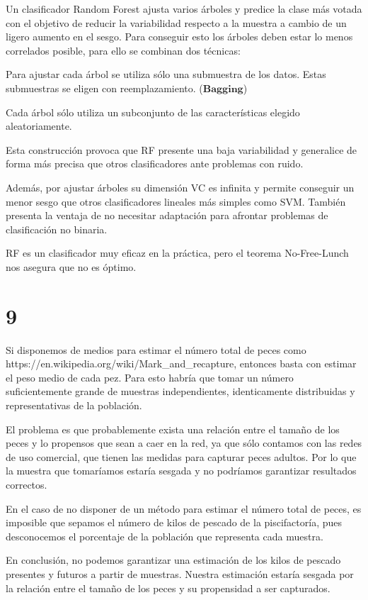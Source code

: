 \documentclass{article}
\begin{document}
Un clasificador Random Forest ajusta varios árboles y predice la clase
más votada con el objetivo de reducir la variabilidad respecto a la
muestra a cambio de un ligero aumento en el sesgo. Para conseguir esto
los árboles deben estar lo menos correlados posible, para ello se
combinan dos técnicas:

Para ajustar cada árbol se utiliza sólo una
submuestra de los datos. Estas submuestras se eligen con
reemplazamiento. (\(\textbf{Bagging}\))

Cada árbol sólo utiliza un subconjunto de las características elegido
aleatoriamente.

Esta construcción provoca que RF presente una baja variabilidad y
generalice de forma más precisa que otros clasificadores ante
problemas con ruido.

Además, por ajustar árboles su dimensión VC es infinita y permite
conseguir un menor sesgo que otros clasificadores lineales más simples
como SVM. También presenta la ventaja de no necesitar adaptación para
afrontar problemas de clasificación no binaria.

RF es un clasificador muy eficaz en la práctica, pero el teorema
No-Free-Lunch nos asegura que no es óptimo.

\section{9}

Si disponemos de medios para estimar el número total de peces como
https://en.wikipedia.org/wiki/Mark\_and\_recapture, entonces basta con
estimar el peso medio de cada pez. Para esto habría que tomar un
número suficientemente grande de muestras independientes,
identicamente distribuidas y representativas de la población.

El problema es que probablemente exista una relación entre el tamaño
de los peces y lo propensos que sean a caer en la red, ya que sólo
contamos con las redes de uso comercial, que tienen las medidas para
capturar peces adultos. Por lo que la muestra que tomaríamos estaría
sesgada y no podríamos garantizar resultados correctos.

En el caso de no disponer de un método para estimar el número total de
peces, es imposible que sepamos el número de kilos de pescado de la
piscifactoría, pues desconocemos el porcentaje de la población que
representa cada muestra.

En conclusión, no podemos garantizar una estimación de los kilos de
pescado presentes y futuros a partir de muestras. Nuestra estimación
estaría sesgada por la relación entre el tamaño de los peces y su
propensidad a ser capturados.
\end{document}
